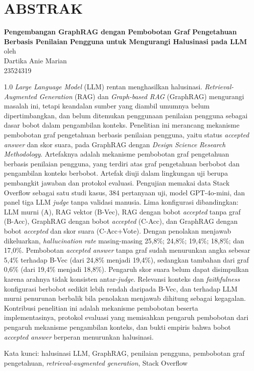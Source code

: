 \chapter*{ABSTRAK}

\begin{center}
    \textbf{Pengembangan GraphRAG dengan Pembobotan Graf Pengetahuan Berbasis Penilaian Pengguna untuk Mengurangi Halusinasi pada LLM} \\
    \vspace{0.4cm}
    oleh \\
    \vspace{0.4cm}
    Dartika Anie Marian\\
    23524319\\
\end{center}

\begin{spacing}{1.0}
\emph{Large Language Model} (LLM) rentan menghasilkan halusinasi. \emph{Retrieval-Augmented Generation} (RAG) dan \emph{Graph-based RAG} (GraphRAG) mengurangi masalah ini, tetapi keandalan sumber yang diambil umumnya belum dipertimbangkan, dan belum ditemukan penggunaan penilaian pengguna sebagai dasar bobot dalam pengambilan konteks. Penelitian ini merancang mekanisme pembobotan graf pengetahuan berbasis penilaian pengguna, yaitu status \emph{accepted answer} dan skor suara, pada GraphRAG dengan \emph{Design Science Research Methodology}. Artefaknya adalah mekanisme pembobotan graf pengetahuan berbasis penilaian pengguna, yang terdiri atas graf pengetahuan berbobot dan pengambilan konteks berbobot. Artefak diuji dalam lingkungan uji berupa pembangkit jawaban dan protokol evaluasi. Pengujian memakai data Stack Overflow sebagai satu studi kasus, 384 pertanyaan uji, model GPT-4o-mini, dan panel tiga LLM \emph{judge} tanpa validasi manusia. Lima konfigurasi dibandingkan: LLM murni (A), RAG vektor (B-Vec), RAG dengan bobot \emph{accepted} tanpa graf (B-Acc), GraphRAG dengan bobot \emph{accepted} (C-Acc), dan GraphRAG dengan bobot \emph{accepted} dan skor suara (C-Acc+Vote). Dengan penolakan menjawab dikeluarkan, \emph{hallucination rate} masing-masing 25,8\%; 24,8\%; 19,4\%; 18,8\%; dan 17,0\%. Pembobotan \emph{accepted answer} tanpa graf sudah menurunkan angka sebesar 5,4\% terhadap B-Vec (dari 24,8\% menjadi 19,4\%), sedangkan tambahan dari graf 0,6\% (dari 19,4\% menjadi 18,8\%). Pengaruh skor suara belum dapat disimpulkan karena arahnya tidak konsisten antar-\emph{judge}. Relevansi konteks dan \emph{faithfulness} konfigurasi berbobot sedikit lebih rendah daripada B-Vec, dan terhadap LLM murni penurunan berbalik bila penolakan menjawab dihitung sebagai kegagalan. Kontribusi penelitian ini adalah mekanisme pembobotan beserta implementasinya, protokol evaluasi yang memisahkan pengaruh pembobotan dari pengaruh mekanisme pengambilan konteks, dan bukti empiris bahwa bobot \emph{accepted answer} berperan menurunkan halusinasi. 

\vspace{0.3cm}
\noindent Kata kunci: halusinasi LLM, GraphRAG, penilaian pengguna, pembobotan graf pengetahuan, \emph{retrieval-augmented generation}, Stack Overflow
\end{spacing}